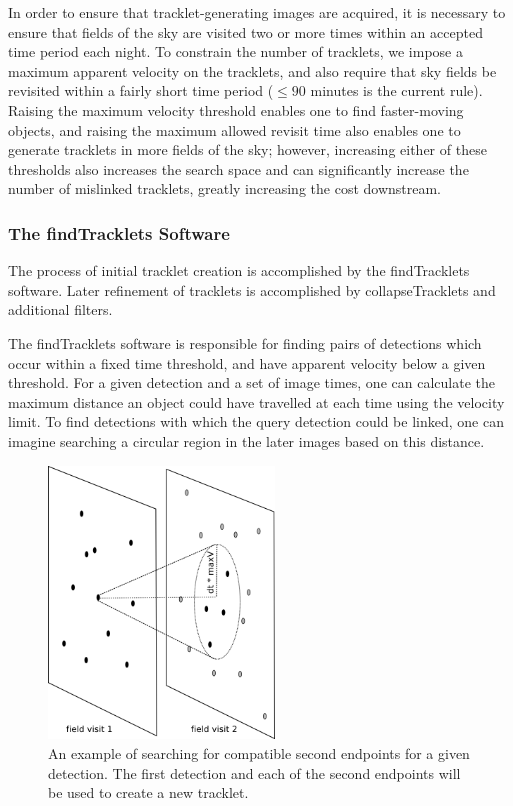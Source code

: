 In order to ensure that tracklet-generating images are acquired, it is
necessary to ensure that fields of the sky are visited two or more
times within an accepted time period each night. To constrain the
number of tracklets, we impose a maximum apparent velocity on the
tracklets, and also require that sky fields be revisited within a
fairly short time period ($\leq 90$ minutes is the current rule).
Raising the maximum velocity threshold enables one to find
faster-moving objects, and raising the maximum allowed revisit time
also enables one to generate tracklets in more fields of the sky;
however, increasing either of these thresholds also increases the
search space and can significantly increase the number of mislinked
tracklets, greatly increasing the cost downstream.




\subsubsection{The findTracklets Software}

The process of initial tracklet creation is accomplished by the
findTracklets software.  Later refinement of tracklets is accomplished
by collapseTracklets and additional filters.


The findTracklets software is responsible for finding pairs of
detections which occur within a fixed time threshold, and have
apparent velocity below a given threshold.  For a given detection and
a set of image times, one can calculate the maximum distance an object
could have travelled at each time using the velocity limit.  To find
detections with which the query detection could be linked, one can
imagine searching a circular region in the later images based on this
distance.

\begin{figure}[ht]
  \centering
    \includegraphics[width=6cm]{illustrations/findTracklets-onequery.png}
    \caption{ An example of searching for compatible second endpoints
      for a given detection.  The first detection and each of the
      second endpoints will be used to create a new tracklet.}
\label{findTrackletsIllustrated}
\end{figure}


